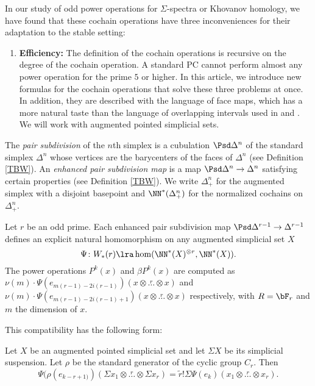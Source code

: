 In our study of odd power operations for $\Sigma$-spectra or Khovanov homology, we have found that these cochain operations have three inconveniences for their adaptation to the stable setting:
\begin{enumerate}
\item {\bf Efficiency:} The definition of the cochain operations is recursive on the degree of the cochain operation. A standard PC cannot perform almost any power operation for the prime $5$ or higher. 
In this article, we introduce new formulas for the cochain operations that solve these three problems at once. In addition, they are described with the language of face maps, which has a more natural taste than the language of overlapping intervals used in \cite{MS02} and \cite{BF03}. We will work with augmented pointed simplicial sets.
\end{enumerate}
The \emph{pair subdivision} of the $n$th simplex is a cubulation $\Psd \Delta^n$ of the standard simplex $\Delta^n$ whose vertices are the barycenters of the faces of $\Delta^n$ (see Definition \ref{TBW}). An \emph{enhanced pair subdivision map} is a map $\Psd \Delta^n\to \Delta^n$ satisfying certain properties (see Definition \ref{TBW}). We write $\Delta^n_+$ for the augmented simplex with a disjoint basepoint and $\NN^*(\Delta^n_+)$ for the normalized cochains on $\Delta^n_+$. %
\begin{theorem} 
	Let $r$ be an odd prime. Each enhanced pair subdivision map $\Psd \Delta^{r-1}\to \Delta^{r-1}$ defines an explicit natural homomorphism on any augmented simplicial set $X$
	\[\Psi\colon W_*(r)\lra \hom(\NN^*(X)^{\otimes r},\NN^*(X)).\]
	The power operations $P^k(x)$ and $\beta P^k(x)$ are computed as $\nu(m)\cdot \Psi(e_{m(r-1)-2i(r-1)})(x\otimes\overset{r}{\ldots}\otimes x)$ and $\nu(m)\cdot \Psi(e_{m(r-1)-2i(r-1)+1})(x\otimes\overset{r}{\ldots}\otimes x)$ respectively, with $R=\bF_r$ and $m$ the dimension of $x$.
\end{theorem}

This compatibility has the following form:
\begin{theorem}
 Let $X$ be an augmented pointed simplicial set and let $\Sigma X$ be its simplicial suspension. Let $\rho$ be the standard generator of the cyclic group $C_r$. Then 
\[\Psi(\rho(e_{k-r+1)})(\Sigma x_1\otimes\overset{r}{\ldots}\otimes \Sigma x_r) = \tilde{r}!\Sigma\Psi(e_{k})(x_1\otimes \overset{r}{\ldots} \otimes x_r).
\]
\end{theorem}

